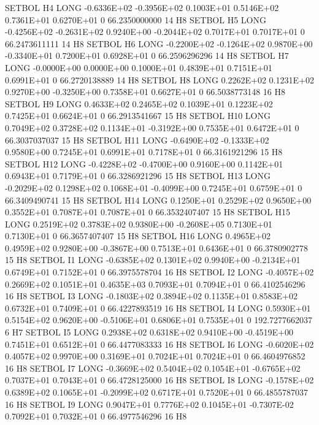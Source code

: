 \documentclass[twoside,11pt,nolof]{starlink}
\begin{document}
\begin{landscape}
\begin{small}
\begin{terminalv}
{{{{ SETBOL H4  LONG     -0.6336E+02 -0.3956E+02  0.1003E+01  0.5146E+02  0.7361E+01  0.6270E+01  0  66.2350000000  14 H8
 SETBOL H5  LONG     -0.4256E+02 -0.2631E+02  0.9240E+00 -0.2044E+02  0.7017E+01  0.7017E+01  0  66.2473611111  14 H8
 SETBOL H6  LONG     -0.2200E+02 -0.1264E+02  0.9870E+00 -0.3340E+01  0.7200E+01  0.6928E+01  0  66.2596296296  14 H8
 SETBOL H7  LONG     -0.0000E+00  0.0000E+00  0.1000E+01  0.4839E+01  0.7151E+01  0.6991E+01  0  66.2720138889  14 H8
 SETBOL H8  LONG      0.2262E+02  0.1231E+02  0.9270E+00 -0.3250E+00  0.7358E+01  0.6627E+01  0  66.5038773148  16 H8
 SETBOL H9  LONG      0.4633E+02  0.2465E+02  0.1039E+01  0.1223E+02  0.7425E+01  0.6624E+01  0  66.2913541667  15 H8
 SETBOL H10 LONG      0.7049E+02  0.3728E+02  0.1134E+01 -0.3192E+00  0.7535E+01  0.6472E+01  0  66.3037037037  15 H8
 SETBOL H11 LONG     -0.6490E+02 -0.1333E+02  0.9580E+00  0.7245E+01  0.6991E+01  0.7178E+01  0  66.3161921296  15 H8
 SETBOL H12 LONG     -0.4228E+02 -0.4700E+00  0.9160E+00  0.1142E+01  0.6943E+01  0.7179E+01  0  66.3286921296  15 H8
 SETBOL H13 LONG     -0.2029E+02  0.1298E+02  0.1068E+01 -0.4099E+00  0.7245E+01  0.6759E+01  0  66.3409490741  15 H8
 SETBOL H14 LONG      0.1250E+01  0.2529E+02  0.9650E+00  0.3552E+01  0.7087E+01  0.7087E+01  0  66.3532407407  15 H8
 SETBOL H15 LONG      0.2519E+02  0.3783E+02  0.9380E+00 -0.2608E+05  0.7130E+01  0.7130E+01  0  66.3657407407  15 H8
 SETBOL H16 LONG      0.4965E+02  0.4959E+02  0.9280E+00 -0.3867E+00  0.7513E+01  0.6436E+01  0  66.3780902778  15 H8
 SETBOL I1  LONG     -0.6385E+02  0.1301E+02  0.9940E+00 -0.2134E+01  0.6749E+01  0.7152E+01  0  66.3975578704  16 H8
 SETBOL I2  LONG     -0.4057E+02  0.2669E+02  0.1051E+01  0.4635E+03  0.7093E+01  0.7094E+01  0  66.4102546296  16 H8
 SETBOL I3  LONG     -0.1803E+02  0.3894E+02  0.1135E+01  0.8583E+02  0.6732E+01  0.7409E+01  0  66.4227893519  16 H8
 SETBOL I4  LONG      0.5930E+01  0.5154E+02  0.9620E+00 -0.5106E+01  0.6806E+01  0.7535E+01  0 192.7277662037   6 H7
 SETBOL I5  LONG      0.2938E+02  0.6318E+02  0.9410E+00 -0.4519E+00  0.7451E+01  0.6512E+01  0  66.4477083333  16 H8
 SETBOL I6  LONG     -0.6020E+02  0.4057E+02  0.9970E+00  0.3169E+01  0.7024E+01  0.7024E+01  0  66.4604976852  16 H8
 SETBOL I7  LONG     -0.3669E+02  0.5404E+02  0.1054E+01 -0.6765E+02  0.7037E+01  0.7043E+01  0  66.4728125000  16 H8
 SETBOL I8  LONG     -0.1578E+02  0.6389E+02  0.1065E+01 -0.2099E+02  0.6717E+01  0.7520E+01  0  66.4855787037  16 H8
 SETBOL I9  LONG      0.9047E+01  0.7776E+02  0.1045E+01 -0.7307E-02  0.7092E+01  0.7032E+01  0  66.4977546296  16 H8

}}}}
\end{terminalv}
\end{small}
\end{landscape}
\end{document}
